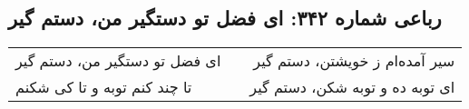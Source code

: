 \begin{center}
\section*{رباعی شماره ۳۴۲: ای فضل تو دستگیر من، دستم گیر}
\label{sec:sh342}
\begin{longtable}{l p{0.5cm} r}
ای فضل تو دستگیر من، دستم گیر
&&
سیر آمده‌ام ز خویشتن، دستم گیر
\\
تا چند کنم توبه و تا کی شکنم
&&
ای توبه ده و توبه شکن، دستم گیر
\\
\end{longtable}
\end{center}
